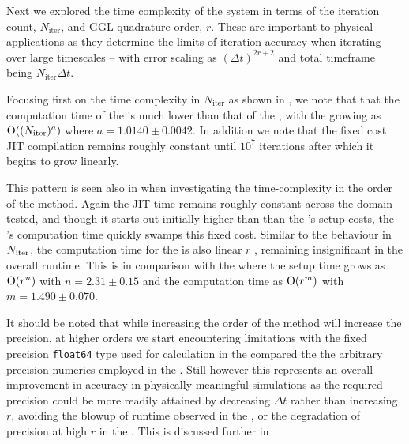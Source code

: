 Next we explored the time complexity of the system in terms of the iteration count, $N_{\text{iter}}$, and GGL quadrature order, $r$. These are important to physical applications as they determine the limits of iteration accuracy when iterating over large timescales -- with error scaling as $(\Delta t)^{2r + 2}$ and total timeframe being $N_{\text{iter}} \Delta t$.

Focusing first on the time complexity in $N_{\text{iter}}$ as shown in , we note that that the computation time of the \updimpl{} is much lower than that of the \orgimpl{}, with the \updimpl{} growing as $\mathord{\mathrm{O}}((N_{\mathrm{iter}})^a)$ where $a = 1.0140 \pm 0.0042$. 
In addition we note that the fixed cost JIT compilation remains roughly constant until $10^7$ iterations after which it begins to grow linearly.

This pattern is seen also in  when investigating the time-complexity in the order of the method. Again the JIT time remains roughly constant across the domain tested, and though it starts out initially higher than than the \orgimpl{}'s setup costs, the \orgimpl{}'s computation time quickly swamps this fixed cost.
Similar to the behaviour in $N_{\mathrm{iter}}$, the computation time for the \updimpl{} is also linear $r$ , remaining insignificant in the overall runtime. This is in comparison with the \orgimpl{} where the setup time grows as $\mathord{\mathrm{O}}(r^n)$ with $n = {2.31 \pm 0.15}$ and the computation time as $\mathord{\mathrm{O}}(r^m)$ with $m={1.490 \pm 0.070}$.

It should be noted that while increasing the order of the method will increase the precision, at higher orders we start encountering limitations with the fixed precision \texttt{float64} type used for calculation in the \updimpl{} compared the the arbitrary precision numerics employed in the \orgimpl{}.
Still however this represents an overall improvement in accuracy in physically meaningful simulations as the required precision could be more readily attained by decreasing $\Delta t$ rather than increasing $r$, avoiding the blowup of runtime observed in the \orgimpl{}, or the degradation of precision at high $r$ in the \updimpl{}. This is discussed further in 

